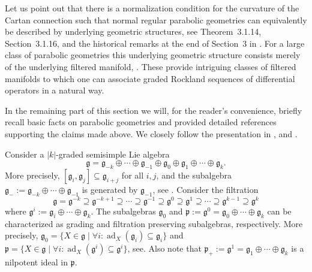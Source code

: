 \documentclass[reqno,12pt]{amsart}
\newcommand\goe{\mathfrak g}
\newcommand\poe{\mathfrak p}
\DeclareMathOperator{\ad}{ad}
\theoremstyle{plain}
\theoremstyle{definition}
\begin{document}
Let us point out that there is a normalization condition for the curvature of the Cartan connection such that normal regular parabolic geometries can equivalently be described by underlying geometric structures, see Theorem~3.1.14, Section~3.1.16, and the historical remarks at the end of Section~3 in \cite{CS09}.
For a large class of parabolic geometries this underlying geometric structure consists merely of the underlying filtered manifold, \cite[Proposition~4.3.1]{CS09}.
These provide intriguing classes of filtered manifolds to which one can associate graded Rockland sequences of differential operators in a natural way.


In the remaining part of this section we will, for the reader's convenience, briefly recall basic facts on parabolic geometries and provided detailed references supporting the claims made above.
We closely follow the presentation in \cite{CS09}, \cite{CSS01} and \cite[Section~2]{CS12}.


Consider a $|k|$-graded semisimple Lie algebra
\begin{equation}\label{E:grading}
\goe=\goe_{-k}\oplus\cdots\oplus\goe_{-1}\oplus\goe_0\oplus\goe_1\oplus\cdots\oplus\goe_k.
\end{equation}
More precisely, $[\goe_i,\goe_j]\subseteq\goe_{i+j}$ for all $i,j$, and the subalgebra $\goe_-:=\goe_{-k}\oplus\cdots\oplus\goe_{-1}$ is generated by $\goe_{-1}$, see \cite[Definition~3.1.2]{CS09}.
Consider the filtration 
\begin{equation}\label{E:filt}
\goe=\goe^{-k}\supseteq\goe^{-k+1}\supseteq\cdots\supseteq\goe^{-1}\supseteq\goe^0\supseteq\goe^1\supseteq\cdots\supseteq\goe^{k-1}\supseteq\goe^k
\end{equation}
where $\goe^i:=\goe_i\oplus\cdots\oplus\goe_k$.
The subalgebras $\goe_0$ and $\poe:=\goe^0=\goe_0\oplus\cdots\oplus\goe_k$ can be characterized as grading and filtration preserving subalgebras, respectively.
More precisely, $\goe_0=\{X\in\goe\mid\forall i:\ad_X(\goe_i)\subseteq\goe_i\}$ and $\poe=\{X\in\goe\mid\forall i:\ad_X(\goe^i)\subseteq\goe^i\}$, see\cite[Lemma~3.1.3(1)]{CS09}.
Also note that $\poe_+:=\goe^1=\goe_1\oplus\cdots\oplus\goe_k$ is a nilpotent ideal in $\poe$.
\end{document}
